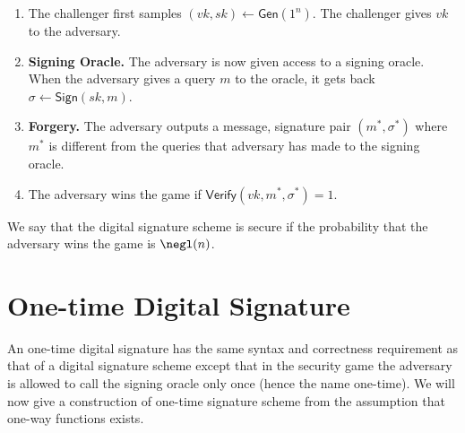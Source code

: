 \documentclass[12pt]{tufte-book}
\newcommand{\Gen}{\mathsf{Gen}}
\newcommand{\Sign}{\mathsf{Sign}}
\newcommand{\Verify}{\mathsf{Verify}}
\begin{document}
\begin{enumerate}
    \item The challenger first samples $(vk,sk) \gets \Gen(1^n)$. The challenger gives $vk$ to the adversary.
    \item \textbf{Signing Oracle.} The adversary is now given access to a signing oracle. When the adversary gives a query $m$ to the oracle, it gets back $\sigma \gets \Sign(sk,m)$.
    \item \textbf{Forgery.} The adversary outputs a message, signature pair $(m^*,\sigma^*)$ where $m^*$ is different from the queries that adversary has made to the signing oracle.
    \item The adversary wins the game if $\Verify(vk,m^*,\sigma^*) = 1$.
\end{enumerate}
We say that the digital signature scheme is secure if the probability that the adversary wins the game is $\negl(n)$.

\section{One-time Digital Signature}
\label{lampart}
An one-time digital signature has the same syntax and correctness requirement as that of a digital signature scheme except that in the security game the adversary is allowed to call the signing oracle only once (hence the name one-time). We will now give a construction of one-time signature scheme from the assumption that one-way functions exists.
\end{document}
